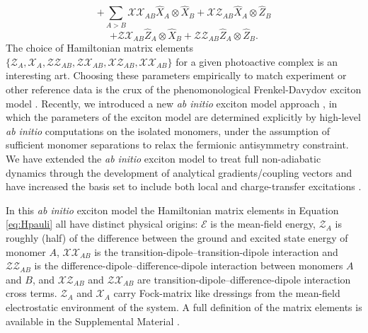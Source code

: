 \documentclass[aps,prl,twocolumn,showpacs,superscriptaddress,groupedaddress]{revtex4}  %
\begin{document}
\[
+
\sum_{A > B}
\mathcal{XX}_{AB}
\hat X_{A} \otimes \hat X_{B}
+
\mathcal{XZ}_{AB}
\hat X_{A} \otimes \hat Z_{B}
\]
\[
+
\mathcal{ZX}_{AB}
\hat Z_{A} \otimes \hat X_{B}
+
\mathcal{ZZ}_{AB}
\hat Z_{A} \otimes \hat Z_{B}
.
\]
The choice of Hamiltonian matrix elements $\{ \mathcal{Z}_{A}, \mathcal{X}_{A},
\mathcal{ZZ}_{AB}, \mathcal{ZX}_{AB}, \mathcal{XZ}_{AB}, \mathcal{XX}_{AB} \}$
for a given photoactive complex is an interesting art. Choosing these parameters
empirically to match experiment or other reference data is the crux of the
phenomonological Frenkel-Davydov exciton model
\cite{Frenkel:1931:17,Davydov:1964:145}. Recently, we introduced a new \emph{ab
initio} exciton model approach 
\cite{
Sisto:2014:2857,
Sisto:2017:14924,
Li:2017:3493,
Morrison:2014:5366,
Morrison:2015:4390}, 
in which the parameters of the exciton model are determined explicitly by
high-level \emph{ab initio} computations on the isolated monomers, under the
assumption of sufficient monomer separations to relax the fermionic antisymmetry
constraint. We have extended the \emph{ab initio} exciton model to treat full
non-adiabatic dynamics through the development of analytical gradients/coupling
vectors \cite{Li:2017:3493,Sisto:2017:14924} and have increased the basis set to
include both local and charge-transfer excitations \cite{Li:2017:3493}.  

In this \emph{ab initio} exciton model the Hamiltonian matrix elements in
Equation \ref{eq:Hpauli} all have distinct physical origins: $\mathcal{E}$ is
the mean-field energy, $\mathcal{Z}_{A}$ is roughly (half) of the difference
between the ground and excited state energy of monomer $A$, $\mathcal{XX}_{AB}$
is the transition-dipole--transition-dipole interaction and $\mathcal{ZZ}_{AB}$
is the difference-dipole--difference-dipole interaction between monomers $A$ and
$B$, and $\mathcal{XZ}_{AB}$ and $\mathcal{ZX}_{AB}$ are
transition-dipole--difference-dipole interaction cross terms. $\mathcal{Z}_{A}$
and $\mathcal{X}_{A}$ carry Fock-matrix like dressings from the mean-field
electrostatic environment of the system. A full definition of the matrix
elements is available in the Supplemental Material \cite{SuppNote}.
\end{document}

